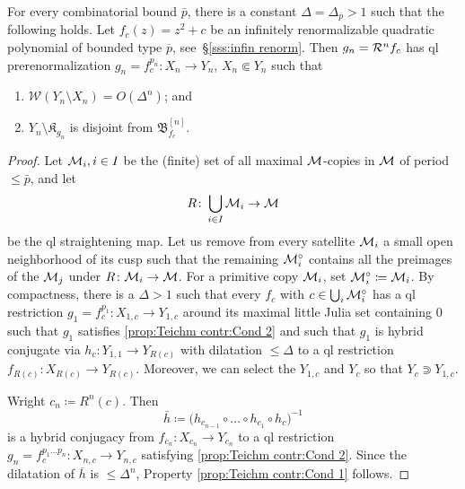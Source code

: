 \documentclass{amsart}
\newcommand{\filled}{{\mathfrak K }}
\newcommand{\bbush}{{\boldsymbol {\mathfrak B} }}
\newcommand{\1}{{\mathbb 1 }}
\newcommand{\Width}{{\mathcal W}}
\begin{document}



\begin{prop}
\label{prop:Teichm contr}
For every combinatorial bound $\bar p$, there is a constant $\Delta=\Delta_{\overline p}>1$ such that the following holds. Let $f_c(z)= z^2+c$ be an infinitely renormalizable quadratic polynomial of bounded type $\overline p$, see~\S\ref{sss:infin renorm}. Then $g_n={\mathcal R}^n f_c$ has ql prerenormalization $g_n=f_c^{p_n}\colon X_n\to Y_n$, $X_n\Subset Y_n$ such that
\begin{enumerate}[label=\text{(\Roman*)},font=\normalfont,leftmargin=*]
\item $\Width(Y_n\setminus X_n)=O( \Delta^n)$; and\label{prop:Teichm contr:Cond 1}
\item  $Y_n\setminus \filled_{g_n}$ is disjoint from $\bbush^{[n]}_{f_c}$.\label{prop:Teichm contr:Cond 2}
\end{enumerate}
\end{prop}
\begin{proof} 
Let ${\mathcal M}_i, i \in I$ be the (finite) set of all maximal ${\mathcal M}$-copies in ${\mathcal M}$ of period $\le \bar p$, and let 
\[R\colon \bigcup _{i\in I}{\mathcal M}_i\to {\mathcal M}\]
be the ql straightening map. Let us remove from every satellite ${\mathcal M}_i$ a  small open neighborhood of its cusp such that the remaining ${\mathcal M}^\circ_i$ contains all the preimages of the ${\mathcal M}_j$ under $R\colon {\mathcal M}_i\to {\mathcal M}$. For a primitive copy ${\mathcal M}_i$, set ${\mathcal M}_i^\circ\coloneqq {\mathcal M}_i$. By compactness, there is a $\Delta>1$ such that every $f_c$ with $c\in \bigcup _i {\mathcal M}_i^\circ$ has a ql restriction $g_1=f_c^{p_1}\colon X_{1,c}\to Y_{1,c}$ around its maximal little Julia set containing $0$ such that $g_1$ satisfies \ref{prop:Teichm contr:Cond 2} and such that $g_1$ is hybrid conjugate via $h_{c}\colon Y_{1,1}\to Y_{R(c)}$ with dilatation $\le \Delta$ to a ql restriction $f_{R(c)}\colon X_{R(c)}\to Y_{R(c)}$. Moreover, we can select the $Y_{1,c}$ and $Y_c$ so that $Y_c\Supset Y_{1,c}$.

Wright $c_n \coloneqq R^n(c)$. Then \[\bar h\coloneqq \big(h_{c_{n-1}}\circ \dots \circ h_{c_1}\circ h_{c}\big)^{-1}\] is a hybrid conjugacy from $f_{c_n}\colon X_{c_n}\to Y_{c_n}$ to a ql restriction $g_n=f^{p_1\dots p_n}_c\colon X_{n,c}\to Y_{n,c}$ satisfying \ref{prop:Teichm contr:Cond 2}. Since the dilatation of $\overline h$ is $\le \Delta^n$, Property \ref{prop:Teichm contr:Cond 1} follows.
\end{proof}
\end{document}
